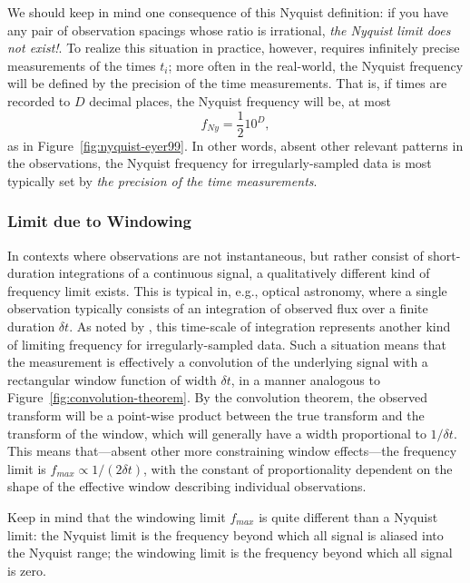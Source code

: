 \documentclass[preprint]{aastex}
\newcommand{\fig}[1]{Figure~\ref{fig:#1}}
\newcommand{\eqlabel}[1]{\label{eq:#1}}
\begin{document}
We should keep in mind one consequence of this Nyquist definition:
if you have any pair of observation spacings
whose ratio is irrational, {\it the Nyquist limit does not exist!}.
To realize this situation in practice, however, 
requires infinitely precise measurements of the
times $t_i$; more often in the real-world, the Nyquist frequency will be
defined by the precision of the time measurements.
That is, if times are recorded to $D$ decimal places, the Nyquist frequency
will be, at most
\begin{equation}
  f_{Ny} = \frac{1}{2} 10^D,
  \eqlabel{nonuniform-nyquist}
\end{equation}
as in \fig{nyquist-eyer99}.
In other words, absent other relevant patterns in the observations,
the Nyquist frequency for irregularly-sampled data is most
typically set by {\it the precision of the time measurements}.

\subsubsection{Limit due to Windowing}

In contexts where observations are not instantaneous, but rather consist of
short-duration integrations of a continuous signal, a qualitatively different
kind of frequency limit exists.
This is typical in, e.g., optical astronomy, where a single observation typically consists of an integration of observed flux over a finite duration $\delta t$.
As noted by \citet{ICVG2014}, this time-scale of integration represents another
kind of limiting frequency for irregularly-sampled data.
Such a situation means that the measurement is effectively a convolution of
the underlying signal with a rectangular window function of width $\delta t$,
in a manner analogous to \fig{convolution-theorem}.
By the convolution theorem, the observed transform will be a point-wise
product between the true transform and the transform of the window, which
will generally have a width proportional to $1/\delta t$.
This means that---absent other more constraining window effects---the
frequency limit is $f_{max} \propto 1/(2\delta t)$, with the constant of
proportionality dependent on the shape of the effective window describing
individual observations.

Keep in mind that the windowing limit $f_{max}$ is quite different than a
Nyquist limit: the Nyquist limit is the frequency beyond which all signal
is aliased into the Nyquist range; the windowing limit is the frequency
beyond which all signal is zero.
\end{document}
